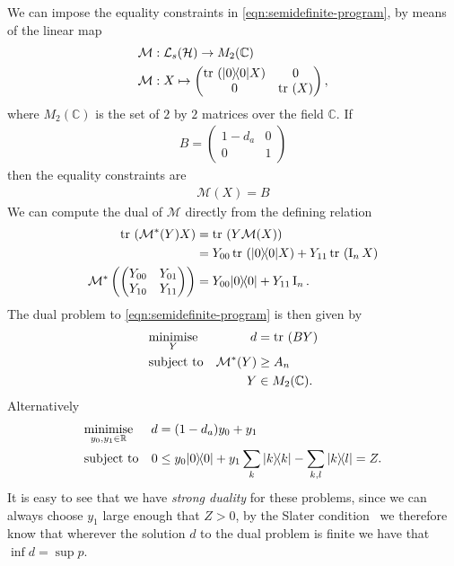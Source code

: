 We can impose the equality constraints in \eqref{eqn:semidefinite-program}, by means of the linear map
\begin{align}
  \mathcal{M}&: \saops[\hcal] \to M_2(\mathbb{C})\\
  \mathcal{M}&:X \mapsto \begin{pmatrix}\tr{\ketbra{0}{0} X} & 0 \\ 0 & \tr{X}\end{pmatrix},
\end{align}
where $M_2(\mathbb{C})$ is the set of $2$ by $2$ matrices over the field $\mathbb{C}$. If
\begin{align}
  B = \begin{pmatrix}1-d_a & 0 \\ 0 & 1\end{pmatrix}
\end{align}
then the equality constraints are
\begin{align}
  \mathcal{M}(X) = B
\end{align}
We can compute the dual of $\mathcal{M}$ directly from the defining relation
\begin{align}
  \tr{\mathcal{M}^*(Y) X} &= \tr{Y \mathcal{M}(X)}\\
                          &= Y_{00} \tr{\ketbra{0}{0}X} + Y_{11} \tr{\opi_n X} \\
  \mathcal{M}^*\left(\begin{pmatrix}Y_{00} & Y_{01} \\ Y_{10} & Y_{11}\end{pmatrix}\right) &= Y_{00} \ketbra{0}{0} + Y_{11}\opi_n.
\end{align}
The dual problem to \eqref{eqn:semidefinite-program} is then given by
\begin{equation}
  \begin{aligned}
    & \underset{Y}{\text{minimise}}
    & d &= \tr{B Y} \\
    & \text{subject to}
    & \mathcal{M}^*(Y) &\geq A_n\\
    && Y &\in M_2(\mathbb{C}).
  \end{aligned}
  \label{eqn:semidefinite-program-dual}
\end{equation}
Alternatively 
\begin{equation}
  \begin{aligned}
    & \underset{y_0, y_1\in\mathbb{R}}{\text{minimise}}
    & d &= (1-d_a)y_0 + y_1 \\
    & \text{subject to}
    & 0&\leq y_0 |0\rangle\!\langle0| + y_1 \sum_k |k\rangle\!\langle k| - \sum_{k,l} |k\rangle\!\langle l| = Z.
  \end{aligned}
\end{equation}
It is easy to see that we have \emph{strong duality} for these problems, since we can always choose $y_1$ large enough that $Z > 0$, by the Slater condition~\cite{rtr-conv-anal-book} we therefore know that wherever the solution $d$ to the dual problem is finite we have that $\inf d=\sup p$.

